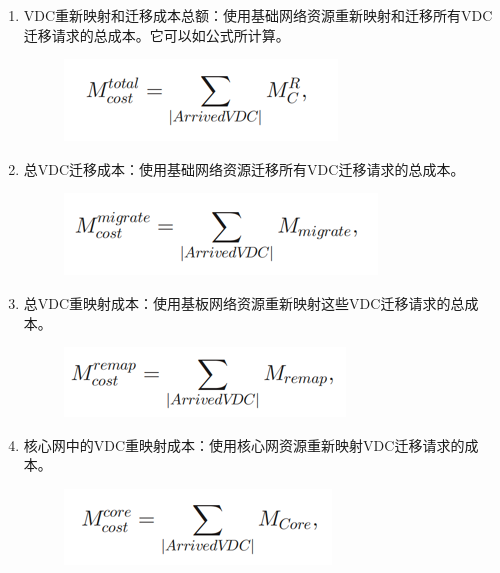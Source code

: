 \begin{enumerate}
    \item VDC重新映射和迁移成本总额：使用基础网络资源重新映射和迁移所有VDC迁移请求的总成本。它可以如公式所计算。

      \begin{figure}[!htb]
    \centering
    \includegraphics{./Figure/express15.png}
  \end{figure}

    \item 总VDC迁移成本：使用基础网络资源迁移所有VDC迁移请求的总成本。

    \begin{figure}[!htb]
    \centering
    \includegraphics{./Figure/express16.png}
  \end{figure}

    \item 总VDC重映射成本：使用基板网络资源重新映射这些VDC迁移请求的总成本。

    \begin{figure}[!htb]
    \centering
    \includegraphics{./Figure/express17.png}
  \end{figure}

    \item 核心网中的VDC重映射成本：使用核心网资源重新映射VDC迁移请求的成本。

    \begin{figure}[!htb]
    \centering
    \includegraphics{./Figure/express18.png}
  \end{figure}


\end{enumerate}
